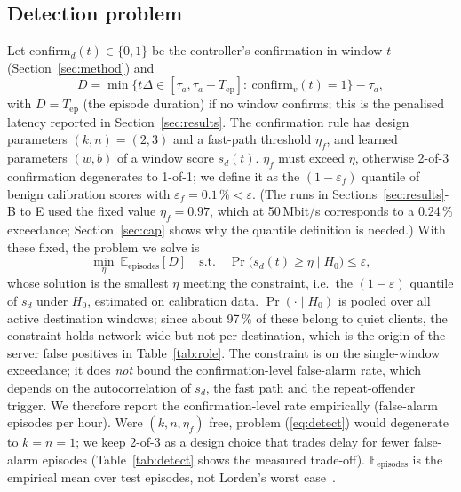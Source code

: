 \documentclass[conference]{IEEEtran}
\begin{document}
\subsection{Detection problem}
Let $\mathrm{confirm}_d(t)\in\{0,1\}$ be the controller's confirmation in window $t$ (Section~\ref{sec:method}) and
\begin{equation}
D=\min\{t\Delta\in[\tau_a,\tau_a{+}T_{\text{ep}}]:\ \mathrm{confirm}_v(t)=1\}-\tau_a,
\end{equation}
with $D=T_{\text{ep}}$ (the episode duration) if no window confirms; this is the penalised latency reported in Section~\ref{sec:results}. The confirmation rule has design parameters $(k,n)=(2,3)$ and a fast-path threshold $\eta_f$, and learned parameters $(w,b)$ of a window score $s_d(t)$. $\eta_f$ must exceed $\eta$, otherwise 2-of-3 confirmation degenerates to 1-of-1; we define it as the $(1-\varepsilon_f)$ quantile of benign calibration scores with $\varepsilon_f=0.1\,\%<\varepsilon$. (The runs in Sections~\ref{sec:results}-B to E used the fixed value $\eta_f=0.97$, which at 50\,Mbit/s corresponds to a 0.24\,\% exceedance; Section~\ref{sec:cap} shows why the quantile definition is needed.) With these fixed, the problem we solve is
\begin{equation}
\min_{\eta}\ \mathbb{E}_{\text{episodes}}[D]\quad\text{s.t.}\quad \Pr\big(s_d(t)\ge\eta\mid H_0\big)\le\varepsilon, \label{eq:detect}
\end{equation}
whose solution is the smallest $\eta$ meeting the constraint, i.e.\ the $(1-\varepsilon)$ quantile of $s_d$ under $H_0$, estimated on calibration data. $\Pr(\cdot\mid H_0)$ is pooled over all active destination windows; since about 97\,\% of these belong to quiet clients, the constraint holds network-wide but not per destination, which is the origin of the server false positives in Table~\ref{tab:role}. The constraint is on the single-window exceedance; it does \emph{not} bound the confirmation-level false-alarm rate, which depends on the autocorrelation of $s_d$, the fast path and the repeat-offender trigger. We therefore report the confirmation-level rate empirically (false-alarm episodes per hour). Were $(k,n,\eta_f)$ free, problem (\ref{eq:detect}) would degenerate to $k=n=1$; we keep 2-of-3 as a design choice that trades delay for fewer false-alarm episodes (Table~\ref{tab:detect} shows the measured trade-off). $\mathbb{E}_{\text{episodes}}$ is the empirical mean over test episodes, not Lorden's worst case~\cite{lorden1971procedures}.
\end{document}
